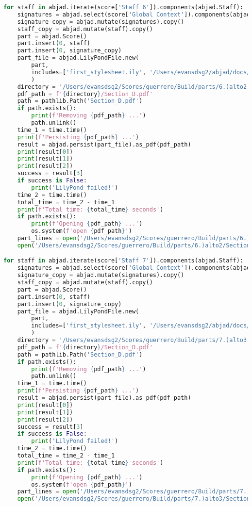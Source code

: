\begin{lstlisting}[language=Python, caption=Invocation Source Code]
for staff in abjad.iterate(score['Staff 6']).components(abjad.Staff):
    signatures = abjad.select(score['Global Context']).components(abjad.Staff)
    signature_copy = abjad.mutate(signatures).copy()
    staff_copy = abjad.mutate(staff).copy()
    part = abjad.Score()
    part.insert(0, staff)
    part.insert(0, signature_copy)
    part_file = abjad.LilyPondFile.new(
        part,
        includes=['first_stylesheet.ily', '/Users/evansdsg2/abjad/docs/source/_stylesheets/abjad.ily'],
        )
    directory = '/Users/evansdsg2/Scores/guerrero/Build/parts/6.)alto2'
    pdf_path = f'{directory}/Section_D.pdf'
    path = pathlib.Path('Section_D.pdf')
    if path.exists():
        print(f'Removing {pdf_path} ...')
        path.unlink()
    time_1 = time.time()
    print(f'Persisting {pdf_path} ...')
    result = abjad.persist(part_file).as_pdf(pdf_path)
    print(result[0])
    print(result[1])
    print(result[2])
    success = result[3]
    if success is False:
        print('LilyPond failed!')
    time_2 = time.time()
    total_time = time_2 - time_1
    print(f'Total time: {total_time} seconds')
    if path.exists():
        print(f'Opening {pdf_path} ...')
        os.system(f'open {pdf_path}')
    part_lines = open('/Users/evansdsg2/Scores/guerrero/Build/parts/6.)alto2/Section_D.ly').readlines()
    open('/Users/evansdsg2/Scores/guerrero/Build/parts/6.)alto2/Section_D.ly', 'w').writelines(part_lines[15:-1])

for staff in abjad.iterate(score['Staff 7']).components(abjad.Staff):
    signatures = abjad.select(score['Global Context']).components(abjad.Staff)
    signature_copy = abjad.mutate(signatures).copy()
    staff_copy = abjad.mutate(staff).copy()
    part = abjad.Score()
    part.insert(0, staff)
    part.insert(0, signature_copy)
    part_file = abjad.LilyPondFile.new(
        part,
        includes=['first_stylesheet.ily', '/Users/evansdsg2/abjad/docs/source/_stylesheets/abjad.ily'],
        )
    directory = '/Users/evansdsg2/Scores/guerrero/Build/parts/7.)alto3'
    pdf_path = f'{directory}/Section_D.pdf'
    path = pathlib.Path('Section_D.pdf')
    if path.exists():
        print(f'Removing {pdf_path} ...')
        path.unlink()
    time_1 = time.time()
    print(f'Persisting {pdf_path} ...')
    result = abjad.persist(part_file).as_pdf(pdf_path)
    print(result[0])
    print(result[1])
    print(result[2])
    success = result[3]
    if success is False:
        print('LilyPond failed!')
    time_2 = time.time()
    total_time = time_2 - time_1
    print(f'Total time: {total_time} seconds')
    if path.exists():
        print(f'Opening {pdf_path} ...')
        os.system(f'open {pdf_path}')
    part_lines = open('/Users/evansdsg2/Scores/guerrero/Build/parts/7.)alto3/Section_D.ly').readlines()
    open('/Users/evansdsg2/Scores/guerrero/Build/parts/7.)alto3/Section_D.ly', 'w').writelines(part_lines[15:-1])


\end{lstlisting}
